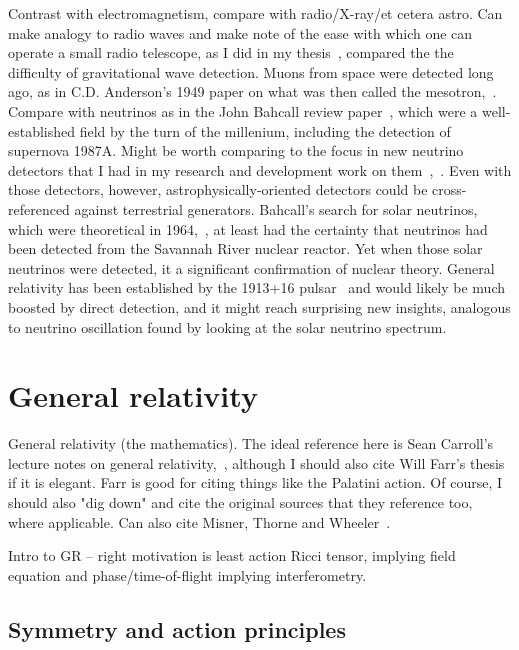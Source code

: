             Contrast with electromagnetism, compare with radio/X-ray/et cetera astro. Can make analogy to radio waves and make note of the ease with which one can operate a small radio telescope, as I did in my thesis~\cite{MeadorsThesis2008}, compared the the difficulty of gravitational wave detection. Muons from space were detected long ago, as in C.D. Anderson's 1949 paper on what was then called the mesotron,~\cite{CDAnderson}. Compare with neutrinos as in the John Bahcall review paper~\cite{NeutrinoReview}, which were a well-established field by the turn of the millenium, including the detection of supernova 1987A. Might be worth comparing to the focus in new neutrino detectors that I had in my research and development work on them~\cite{EBubble2005},~\cite{MeadorsNevis2006}. Even with those detectors, however, astrophysically-oriented detectors could be cross-referenced against terrestrial generators. Bahcall's search for solar neutrinos, which were theoretical in 1964,~\cite{NeutrinosSolarTheoretical}, at least had the certainty that neutrinos had been detected from the Savannah River nuclear reactor. Yet when those solar neutrinos were detected, it a significant confirmation of nuclear theory. General relativity has been established by the 1913+16 pulsar~\cite{WeisbergTaylor2004} and would likely be much boosted by direct detection, and it might reach surprising new insights, analogous to neutrino oscillation found by looking at the solar neutrino spectrum.
        

    \section{General relativity}
    \label{general_relativity}

        General relativity (the mathematics). The ideal reference here is Sean Carroll's lecture notes on general relativity,~\cite{Carroll1997}, although I should also cite Will Farr's thesis~\cite{FarrThesis} if it is elegant. Farr is good for citing things like the Palatini action. Of course, I should also "dig down" and cite the original sources that they reference too, where applicable. Can also cite Misner, Thorne and Wheeler~\cite{MisnerThorneWheeler}.

Intro to GR -- right motivation is least action Ricci tensor, implying field equation and phase/time-of-flight implying interferometry.

        \subsection{Symmetry and action principles}
        \label{principles}

